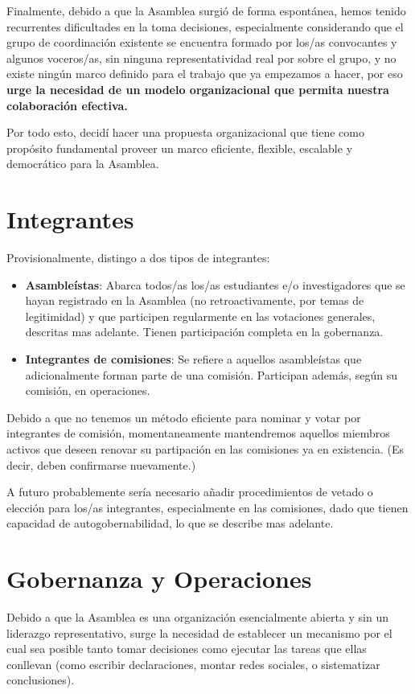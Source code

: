 \documentclass[justified]{tufte-handout} %
\begin{document}
Finalmente, debido a que la Asamblea surgió de forma espontánea, hemos tenido recurrentes dificultades en la toma decisiones, especialmente considerando que el grupo de coordinación existente se encuentra formado por los/as convocantes y algunos voceros/as, sin ninguna representatividad real por sobre el grupo, y no existe ningún marco definido para el trabajo que ya empezamos a hacer, por eso \textbf{urge la necesidad de un modelo organizacional que permita nuestra colaboración efectiva.}

Por todo esto, decidí hacer una propuesta organizacional que tiene como propósito fundamental proveer un marco eficiente, flexible, escalable y democrático para la Asamblea.
\pagebreak

\section{Integrantes}\label{sec:integrantes}

Provisionalmente, distingo a dos tipos de integrantes:
\begin{itemize}
	\item \textbf{Asambleístas}: Abarca todos/as los/as estudiantes e/o investigadores que se hayan registrado en la Asamblea (no retroactivamente, por temas de legitimidad) y que participen regularmente en las votaciones generales, descritas mas adelante. Tienen participación completa en la gobernanza.
	\item \textbf{Integrantes de comisiones}: Se refiere a aquellos asambleístas que adicionalmente forman parte de una comisión. Participan además, según su comisión, en operaciones.
\end{itemize}
Debido a que no tenemos un método eficiente para nominar y votar por integrantes de comisión, momentaneamente mantendremos aquellos miembros activos que deseen renovar su partipación en las comisiones ya en existencia. (Es decir, deben confirmarse nuevamente.)

A futuro probablemente sería necesario añadir procedimientos de vetado o elección para los/as integrantes, especialmente en las comisiones, dado que tienen capacidad de autogobernabilidad, lo que se describe mas adelante.

\section{Gobernanza y Operaciones}\label{sec:gobyop}
Debido a que la Asamblea es una organización esencialmente abierta y sin un liderazgo representativo, surge la necesidad de establecer un mecanismo por el cual sea posible tanto tomar decisiones como ejecutar las tareas que ellas conllevan (como escribir declaraciones, montar redes sociales, o sistematizar conclusiones).
\end{document}

